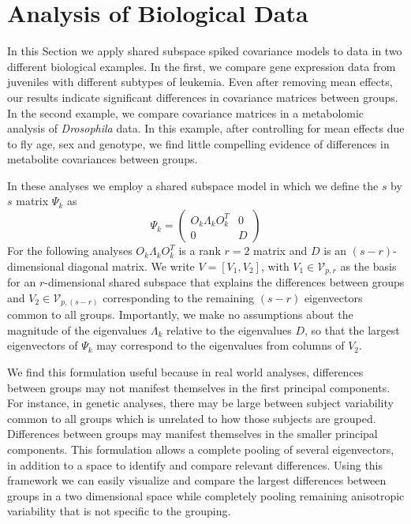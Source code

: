 \documentclass[12pt]{article}
\newcommand{\tr}{\text{tr}}
\begin{document}


\section{Analysis of Biological Data}
\label{sec:app}

In this Section we apply shared subspace spiked covariance models to data in two
different biological examples.  In the first, we compare gene
expression data from juveniles with different subtypes of leukemia.  Even
after removing mean effects, our results indicate significant differences
in covariance matrices between groups.  In the second example, we
compare covariance matrices in a metabolomic analysis of \textit{Drosophila} data.  In
this example, after controlling for mean effects due to fly age, sex and
genotype, we find little compelling evidence of differences in metabolite
covariances between groups. 

In these analyses we employ a shared subspace model in
which we define the $s$ by $s$ matrix $\Psi_k$ as
%
\begin{equation}
\Psi_k =\left( \begin{array}{cc}
O_k\Lambda_kO_k^T & 0  \\
0 & D  \end{array} \right)
\end{equation}
%
For the following analyses $O_k\Lambda_kO_k^T$ is a rank $r=2$ matrix
and $D$ is an $(s-r)$-dimensional diagonal matrix.  We write
$V = [V_1, V_2]$, with $V_1 \in \mathcal{V}_{p,r}$ as the basis for an
$r$-dimensional shared subspace that explains the differences between
groups and $V_2 \in \mathcal{V}_{p,(s-r)}$ corresponding to the remaining $(s-r)$
eigenvectors common to all groups.  Importantly, we make no assumptions about the
magnitude of the eigenvalues $\Lambda_k$ relative to the eigenvalues
$D$, so that the largest eigenvectors of $\Psi_k$ may correspond to
the eigenvalues from columns of $V_2$.  

We find this formulation useful because in real world analyses,
differences between groups may not manifest themselves in the first
principal components.  For instance, in genetic analyses, there may be
large between subject variability common to all groups which is
unrelated to how those subjects are grouped. Differences between
groups may manifest themselves in the smaller principal
components. This formulation allows a complete pooling of several
eigenvectors, in addition to a space to identify and compare relevant
differences.  Using this framework we can easily visualize and compare the
largest differences between groups in a two dimensional space while
completely pooling remaining anisotropic variability that is not
specific to the grouping.
\end{document}

